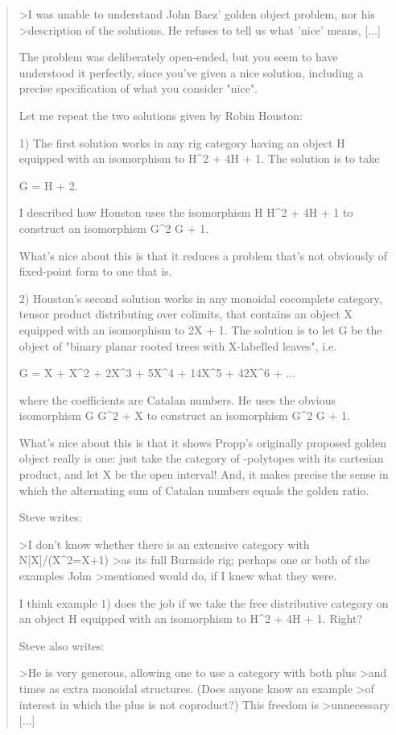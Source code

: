 \begin{quote}
>I was unable to understand John Baez' golden object problem, nor his
>description of the solutions.  He refuses to tell us what 'nice' means, [...]

The problem was deliberately open-ended, but you seem to have 
understood it perfectly, since you've given a nice solution, 
including a precise specification of what you consider "nice".  

Let me repeat the two solutions given by Robin Houston:

1) The first solution works in any rig category having an object H 
equipped with an isomorphism to H^2 + 4H + 1.  The solution is to take

G = H + 2.

I described how Houston uses the isomorphism H \to  H^2 + 4H + 1 to 
construct an isomorphism G^2 \to  G + 1.  

What's nice about this is that it reduces a problem that's not 
obviously of fixed-point form to one that is.

2) Houston's second solution works in any monoidal cocomplete category, 
tensor product distributing over colimits, that contains an object X 
equipped with an isomorphism to 2X + 1.  The solution is to let G be 
the object of "binary planar rooted trees with X-labelled leaves", i.e.

G = X + X^2 + 2X^3 + 5X^4 + 14X^5 + 42X^6 + ...

where the coefficients are Catalan numbers.  He uses the obvious 
isomorphism G \to  G^2 + X to construct an isomorphism G^2 \to  G + 1.

What's nice about this is that it shows Propp's originally proposed
golden object really is one: just take the category of \sigma -polytopes 
with its cartesian product, and let X be the open interval!  And,
it makes precise the sense in which the alternating sum of Catalan
numbers equals the golden ratio.

Steve writes:

>I don't know whether there is an extensive category with N[X]/(X^2=X+1) 
>as its full Burnside rig; perhaps one or both of the examples John 
>mentioned would do, if I knew what they were.

I think example 1) does the job if we take the free distributive
category on an object H equipped with an isomorphism to H^2 + 4H + 1.
Right?

Steve also writes:

>He is very generous, allowing one to use a category with both plus 
>and times as extra monoidal structures.  (Does anyone know an example 
>of interest in which the plus is not coproduct?)  This freedom is 
>unnecessary [...]


\end{quote}
